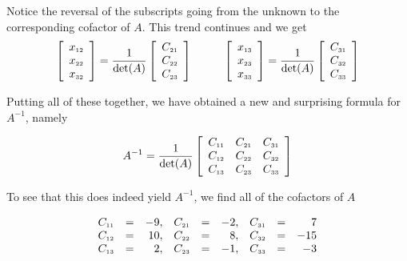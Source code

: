 \documentclass{ximera}
\begin{document}
Notice the reversal of the subscripts going from the unknown to the corresponding cofactor of $A$. This trend continues and we get
\[ \begin{array}{cc}

\left[ \begin{array}{r} x_{\mbox{\tiny$12$}} \\ x_{\mbox{\tiny$22$}} \\ x_{\mbox{\tiny$32$}} \end{array} \right] =  \dfrac{1}{\det(A)} \left[ \begin{array}{r} C_{\mbox{\tiny$21$}} \\ C_{\mbox{\tiny$22$}} \\ C_{\mbox{\tiny$23$}} \end{array} \right]

&
\qquad

\left[ \begin{array}{r} x_{\mbox{\tiny$13$}} \\ x_{\mbox{\tiny$23$}} \\ x_{\mbox{\tiny$33$}} \end{array} \right] =  \dfrac{1}{\det(A)} \left[ \begin{array}{r} C_{\mbox{\tiny$31$}} \\ C_{\mbox{\tiny$32$}} \\ C_{\mbox{\tiny$33$}} \end{array} \right]

\end{array}\]

Putting all of these together, we have obtained a new and surprising formula for $A^{-1}$, namely

\[ A^{-1} = \dfrac{1}{\det(A)} \left[ \begin{array}{ccc} C_{\mbox{\tiny$11$}} & C_{\mbox{\tiny$21$}} & C_{\mbox{\tiny$31$}} \\ C_{\mbox{\tiny$12$}} & C_{\mbox{\tiny$22$}} & C_{\mbox{\tiny$32$}} \\ C_{\mbox{\tiny$13$}} & C_{\mbox{\tiny$23$}} & C_{\mbox{\tiny$33$}} \\ \end{array} \right] \]

To see that this does indeed yield $A^{-1}$, we find all of the cofactors of $A$

\[\begin{array}{rcrrcrrcr}

C_{\mbox{\tiny$11$}} & = & -9, & C_{\mbox{\tiny$21$}} & = & -2, & C_{\mbox{\tiny$31$}} & = & 7\\

C_{\mbox{\tiny$12$}} & = & 10, & C_{\mbox{\tiny$22$}} & = & 8, & C_{\mbox{\tiny$32$}} & = & -15 \\

C_{\mbox{\tiny$13$}} & = &  2,  & C_{\mbox{\tiny$23$}} & = & -1,  & C_{\mbox{\tiny$33$}} & = & -3 \\

\end{array} \]
\end{document}
